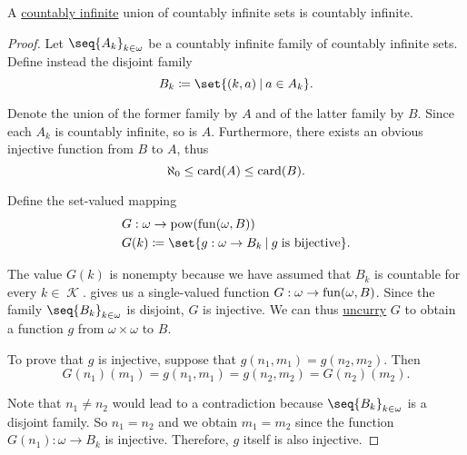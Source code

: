\begin{proposition}\label{thm:countably_infinite_union_of_countably_infinite_sets}
  A \hyperref[def:set_countability/countably_infinite]{countably infinite} union of countably infinite sets is countably infinite.
\end{proposition}
\begin{proof}
  Let \( \seq{ A_k }_{k \in \omega} \) be a countably infinite family of countably infinite sets. Define instead the disjoint family
  \begin{equation*}
    B_k \coloneqq \set{ (k, a) \given a \in A_k }.
  \end{equation*}

  Denote the union of the former family by \( A \) and of the latter family by \( B \). Since each \( A_k \) is countably infinite, so is \( A \). Furthermore, there exists an obvious injective function from \( B \) to \( A \), thus
  \begin{equation}\label{eq:thm:countably_infinite_union_of_countably_infinite_sets/union_card_inequality}
    \aleph_0 \leq \operatorname{card}(A) \leq \operatorname{card}(B).
  \end{equation}

  Define the set-valued mapping
  \begin{equation*}
    \begin{aligned}
      &G: \omega \to \pow(\fun(\omega, B)) \\
      &G(k) \coloneqq \set{ g: \omega \to B_k \given g \T{is bijective} }.
    \end{aligned}
  \end{equation*}

  The value \( G(k) \) is nonempty because we have assumed that \( B_k \) is countable for every \( k \in \mscrK \).  gives us a single-valued function \( G: \omega \to \operatorname{fun}(\omega, B) \). Since the family \( \seq{ B_k }_{k \in \omega} \) is disjoint, \( G \) is injective. We can thus \hyperref[def:function_currying]{uncurry} \( G \) to obtain a function \( g \) from \( \omega \times \omega \) to \( B \).

  To prove that \( g \) is injective, suppose that \( g(n_1, m_1) = g(n_2, m_2) \). Then
  \begin{equation*}
    G(n_1)(m_1) = g(n_1, m_1) = g(n_2, m_2) = G(n_2)(m_2).
  \end{equation*}

  Note that \( n_1 \neq n_2 \) would lead to a contradiction because  \( \seq{ B_k }_{k \in \omega} \) is a disjoint family. So \( n_1 = n_2 \) and we obtain \( m_1 = m_2 \) since the function \( G(n_1): \omega \to B_k \) is injective. Therefore, \( g \) itself is also injective.


\end{proof}
